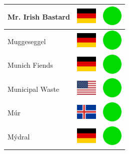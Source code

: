 \documentclass[12pt, a4paper, twoside]{report}
\begin{document}
\begin{center}
\begin{longtable}{|p{5cm}|p{2cm}|p{2cm}|}
 Mr. Irish Bastard                                          & \includegraphics[width=1cm]{../img/flags/de} &   \includegraphics[width=1cm]{../likes/y} \\ \hline
 Muggeseggel                                                & \includegraphics[width=1cm]{../img/flags/de} &   \includegraphics[width=1cm]{../likes/y} \\ \hline
 Munich Fiends                                              & \includegraphics[width=1cm]{../img/flags/de} &   \includegraphics[width=1cm]{../likes/y} \\ \hline
 Municipal Waste                                            & \includegraphics[width=1cm]{../img/flags/us} &   \includegraphics[width=1cm]{../likes/y} \\ \hline
 Múr                                                        & \includegraphics[width=1cm]{../img/flags/is} &   \includegraphics[width=1cm]{../likes/y} \\ \hline
 Mýdral                                                     & \includegraphics[width=1cm]{../img/flags/de} &   \includegraphics[width=1cm]{../likes/y} \\ \hline

\end{longtable}
\end{center}
\end{document}

